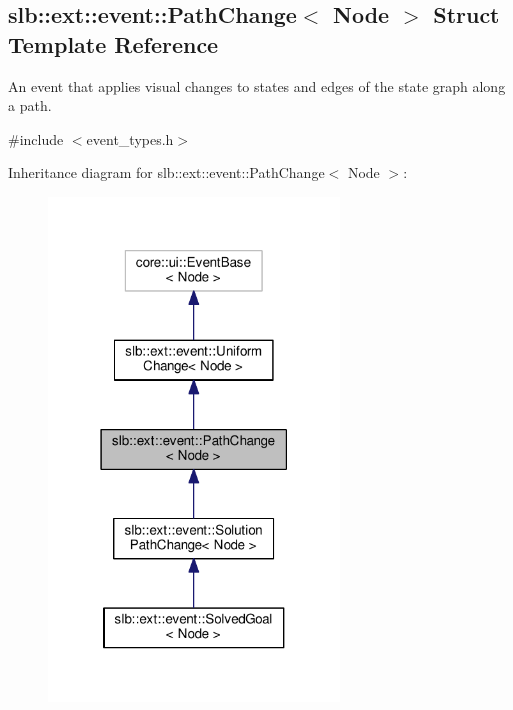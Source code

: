 \hypertarget{structslb_1_1ext_1_1event_1_1PathChange}{}\subsection{slb\+:\+:ext\+:\+:event\+:\+:Path\+Change$<$ Node $>$ Struct Template Reference}
\label{structslb_1_1ext_1_1event_1_1PathChange}


An event that applies visual changes to states and edges of the state graph along a path.  




{\ttfamily \#include $<$event\+\_\+types.\+h$>$}



Inheritance diagram for slb\+:\+:ext\+:\+:event\+:\+:Path\+Change$<$ Node $>$\+:\nopagebreak
\begin{figure}[H]
\begin{center}
\leavevmode
\includegraphics[width=219pt]{structslb_1_1ext_1_1event_1_1PathChange__inherit__graph}
\end{center}
\end{figure}


